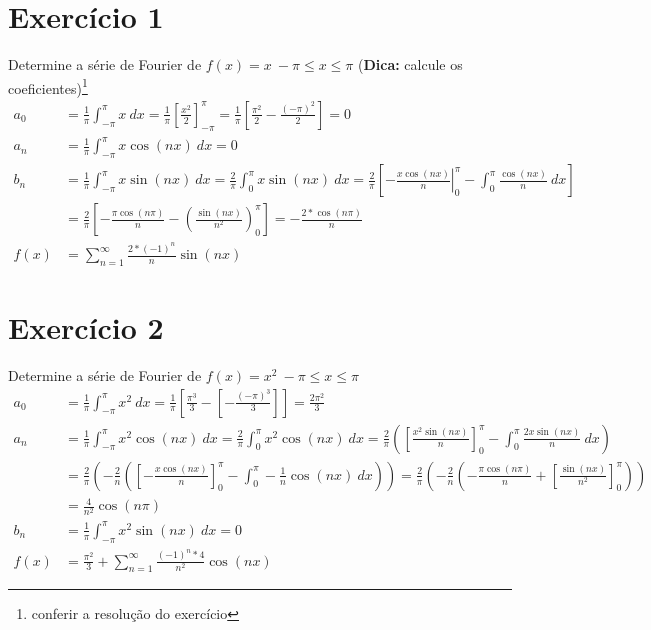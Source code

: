 \documentclass[12pt,openany, letterpaper]{book}
\newcommand{\soma}[2][n]{\sum_{{#1} = #2}^\infty}
\newcommand{\E}[1]{Exercício #1}
\newcommand{\IP}{\int_{-\pi}^{\pi}}
\begin{document}
{{\section*{\E 1} Determine a série de Fourier de $f(x) = x\ -\pi \leq x \leq \pi$ (\textbf{Dica:} calcule os coeficientes)\footnote{conferir a resolução do exercício} \begin{align*}
    a_0 &= \frac{1}{\pi} \IP x \ dx =     \frac{1}{\pi}\left[\frac{x^2}{2}\right]_{-\pi}^{\pi} =\frac{1}{\pi}         \left[\frac{\pi^2}{2}-\frac{(-\pi)^2}{2}\right] = 0 \\
    a_n &= \frac{1}{\pi}\IP x \cos (nx) \ dx = 0 \\
    b_n &= \frac{1}{\pi}\IP x \sin (nx) \ dx = \frac{2}{\pi} \int_0^\pi x \sin (nx)\ dx = \frac{2}{\pi} \left[ \left. -\frac{x \cos (nx)}{n}\right|_0^\pi - \int_0^\pi \frac{\cos (nx)}{n} \ dx \right] \\
    &= \frac{2}{\pi}\left[-\frac{\pi \cos (n\pi)}{n}-\left(\frac{\sin (nx)}{n^2}\right)_0^\pi \right] = -\frac{2 * \cos (n\pi)}{n} \\
    f(x) &= \soma{1} \frac{2*(-1)^n}{n}\sin (nx)
\end{align*}

\section*{\E 2} Determine a série de Fourier de $f(x) = x^2\ -\pi \leq x \leq \pi$ \begin{align*}
    a_0 &= \frac{1}{\pi} \IP x^2 \ dx = \frac{1}{\pi} \left[\frac{\pi^3}{3}-\left[-\frac{(-\pi)^3}{3}\right]\right] = \frac{2\pi^2}{3}\\
    a_n &= \frac{1}{\pi} \IP x^2 \cos (nx) \ dx = \frac{2}{\pi} \int_0^\pi x^2 \cos (nx) \ dx = \frac{2}{\pi}\left( \left[ \frac{x^2 \sin (nx)}{n}\right]_0^\pi- \int_0^\pi \frac{2x \sin (nx)}{n} \ dx\right) \\
    &= \frac{2}{\pi}\left(-\frac{2}{n}\left(\left[-\frac{x \cos (nx)}{n}\right]_0^\pi - \int_0^\pi -\frac{1}{n}\cos (nx)\ dx \right)\right) = \frac{2}{\pi}\left(-\frac{2}{n}\left(-\frac{\pi \cos (n\pi)}{n} + \left[\frac{\sin (nx)}{n^2}\right]_0^\pi\right)\right) \\
    &= \frac{4}{n^2}\cos (n\pi)\\
    b_n &= \frac{1}{\pi} \IP x^2 \sin (nx) \ dx = 0 \\
    f(x) &= \frac{\pi^2}{3}+\soma{1} \frac{(-1)^n * 4}{n^2} \cos (nx)
\end{align*}

}}
\end{document}
